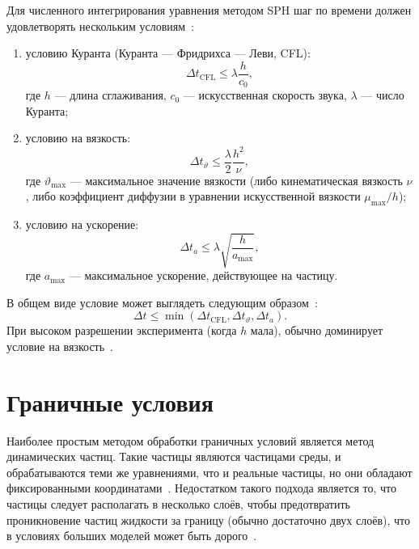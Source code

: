 Для численного интегрирования уравнения методом SPH шаг по времени должен удовлетворять нескольким условиям~\cite{Morris1997,Crespo2007}:
%
\begin{enumerate}
    \item условию Куранта (Куранта --- Фридрихса --- Леви, CFL):
        \begin{equation}
            \Delta t_{\text{CFL}} \leq \lambda \frac{h}{c_{0}},
        \end{equation}
        где $h$ --- длина сглаживания, 
        $c_{0}$ --- искусственная скорость звука, 
        $\lambda$ --- число Куранта;

    \item условию на вязкость:
        \begin{equation}
            \Delta t_{\vartheta} \leq \frac{\lambda}{2} \frac{h^{2}}{\nu},
        \end{equation}
        где $\vartheta_{\text{max}}$ --- максимальное значение вязкости 
        (либо кинематическая вязкость $\nu$, либо коэффициент диффузии в уравнении искусственной вязкости $\mu_{\text{max}}/h$);

    \item условию на ускорение:
        \begin{equation}
            \Delta t_{a} \leq \lambda \sqrt{\frac{h}{a_{\text{max}}}},
        \end{equation}
        где $a_{\text{max}}$ --- максимальное ускорение, действующее на частицу.

\end{enumerate}
%
В общем виде условие может выглядеть следующим образом~\cite{Monaghan1989}:
%
\begin{equation}
    \Delta t \leq \min(\Delta t_{\text{CFL}}, \Delta t_{\vartheta}, \Delta t_{a}).
\end{equation}
%
При высоком разрешении эксперимента (когда $h$ мала), обычно доминирует условие на вязкость~\cite{Morris1997}.

\section{Граничные условия}

Наиболее простым методом обработки граничных условий является метод динамических частиц.
%
Такие частицы являются частицами среды, и обрабатываются теми же уравнениями, 
что и реальные частицы, но они обладают фиксированными координатами~\cite{Morris1997}.
%
Недостатком такого подхода является то, что частицы следует располагать в несколько слоёв, 
чтобы предотвратить проникновение частиц жидкости за границу (обычно достаточно двух слоёв),
что в условиях больших моделей может быть дорого~\cite{Dalrymple2001}.

